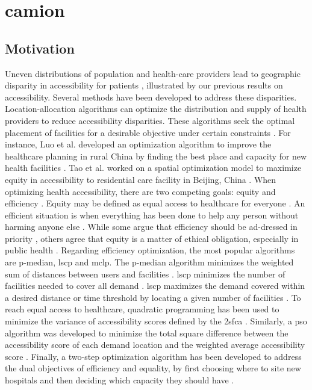 \chapter{\acf{camion}}

\section{Motivation}

Uneven distributions of population and health-care providers lead to geographic
disparity in accessibility for patients \cite{wang_why_2020}, illustrated by our
previous results on accessibility. Several methods have been developed to
address these disparities. Location-allocation algorithms
\cite{church_location_1999} can optimize the distribution and supply of health
providers to reduce accessibility disparities. These algorithms seek the optimal
placement of facilities for a desirable objective under certain constraints
\cite{wang_measurement_2012}. For instance, Luo et al. developed an optimization
algorithm to improve the healthcare planning in rural China by finding the best
place and capacity for new health facilities \cite{luo_integrating_2014}. Tao et
al. worked on a spatial optimization model to maximize equity in accessibility
to residential care facility in Beijing, China \cite{tao_spatial_2014}. When
optimizing health accessibility, there are two competing goals: equity and
efficiency \cite{krugman_opinion_2013,meyer_equity_2008}. Equity may be defined
as equal access to healthcare for everyone \cite{culyer_equity_1993}. An
efficient situation is when everything has been done to help any person without
harming anyone else \cite{hemenway_optimal_1982}. While some argue that
efficiency should be ad-dressed in priority \cite{hemenway_optimal_1982}, others
agree that equity is a matter of ethical obligation, especially in public health
\cite{fried_rights_1975, oliver_equity_2004}. Regarding efficiency optimization,
the most popular algorithms are p-median, \ac{lscp} and \ac{mclp}. The p-median
algorithm minimizes the weighted sum of distances between users and facilities
\cite{murad_using_2021}. \ac{lscp} minimizes the number of facilities needed to
cover all demand \cite{shavandi_fuzzy_2006}. \ac{lscp} maximizes the demand
covered within a desired distance or time threshold by locating a given number
of facilities \cite{casado_heuristical_2005}. To reach equal access to
healthcare, quadratic programming has been used to  minimize the variance of
accessibility scores defined by the \ac{2sfca} \cite{wang_planning_2013}.
Similarly, a \ac{pso} algorithm was developed to minimize the total square
difference between the accessibility score of each demand location and the
weighted average accessibility score \cite{tao_spatial_2014}. Finally, a
two-step optimization algorithm has been developed to address the dual
objectives of efficiency and equality, by first choosing where to site new
hospitals and then deciding which capacity they should have
\cite{luo_two-step_2017,li_two-step_2017}.

